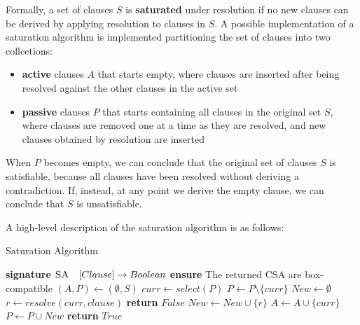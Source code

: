 Formally, a set of clauses \(S\) is \textbf{saturated} under resolution if no new clauses can be derived by applying resolution to clauses in \(S\).
A possible implementation of a saturation algorithm is implemented partitioning the set of clauses into two collections: 

\begin{itemize}
  \item \textbf{active} clauses \(A\) that starts empty, where clauses are inserted after being resolved against the other clauses in the active set
  \item \textbf{passive} clauses \(P\) that starts containing all clauses in the original set \(S\), where clauses are removed one at a time as they are resolved, and new clauses obtained by resolution are inserted
\end{itemize}

When \(P\) becomes empty, we can conclude that the original set of clauses \(S\) is satisfiable, because all clauses have been resolved without deriving a contradiction.
If, instead, at any point we derive the empty clause, we can conclude that \(S\) is unsatisfiable.

A high-level description of the saturation algorithm is as follows:
\begin{algorithm}[H]
    \caption{Saturation Algorithm}\label{alg:padding}
    \begin{algorithmic}[1]
        \Statex{} \textbf{signature} \(\textsc{SA} \quad [Clause] \to Boolean\)
        \Statex{} \textbf{ensure} The returned CSA are box-compatible
            \State{} \((A,P)\gets (\emptyset,S)\)
                \State{} \(curr \gets select(P)\)
                \State{} \(P \gets P \setminus \{curr\}\)
                \State{} \(New \gets \emptyset\)
                    \State{} \(r \gets resolve(curr, clause)\)
                        \State{} \textbf{return} \(False\)
                        \State{} \(New \gets New \cup \{r\}\)
                    \EndIf{}
                \EndFor{}
                \State{} \(A \gets A \cup \{curr\}\)
                \State{} \(P \gets P \cup New\)
            \EndWhile{}
            \State{} \textbf{return} \(True\)
        \EndFunction{}
    \end{algorithmic}
\end{algorithm}

